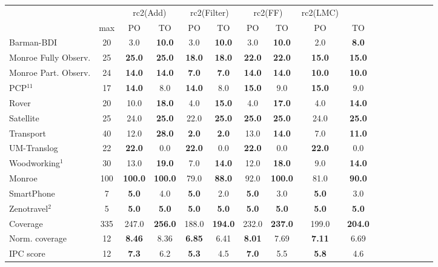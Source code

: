 \begin{tabular}{lccccccccccccccccl} 
\toprule 
  && \multicolumn{2}{c}{rc2(Add)} & \multicolumn{2}{c}{rc2(Filter)} & \multicolumn{2}{c}{rc2(FF)} & \multicolumn{2}{c}{rc2(LMC)} \\ 
\cmidrule(lr){3-4} \cmidrule(lr){5-6} \cmidrule(lr){7-8} \cmidrule(lr){9-10}  
 & max &PO & TO & PO & TO & PO & TO & PO &\multicolumn{2}{c}{ TO  } \\ 
\midrule 
Barman-BDI & 20 & 3.0 & \textbf{10.0} & 3.0 & \textbf{10.0} & 3.0 & \textbf{10.0} & 2.0 &\multicolumn{2}{c}{ \textbf{8.0}  } \\ 
Monroe Fully Observ. & 25 & \textbf{25.0} & \textbf{25.0} & \textbf{18.0} & \textbf{18.0} & \textbf{22.0} & \textbf{22.0} & \textbf{15.0} &\multicolumn{2}{c}{ \textbf{15.0}  } \\ 
Monroe Part. Observ. & 24 & \textbf{14.0} & \textbf{14.0} & \textbf{7.0} & \textbf{7.0} & \textbf{14.0} & \textbf{14.0} & \textbf{10.0} &\multicolumn{2}{c}{ \textbf{10.0}  } \\ 
PCP$^{11}$ & 17 & \textbf{14.0} & 8.0 & \textbf{14.0} & 8.0 & \textbf{15.0} & 9.0 & \textbf{15.0} &\multicolumn{2}{c}{ 9.0  } \\ 
Rover & 20 & 10.0 & \textbf{18.0} & 4.0 & \textbf{15.0} & 4.0 & \textbf{17.0} & 4.0 &\multicolumn{2}{c}{ \textbf{14.0}  } \\ 
Satellite & 25 & 24.0 & \textbf{25.0} & 22.0 & \textbf{25.0} & \textbf{25.0} & \textbf{25.0} & 24.0 &\multicolumn{2}{c}{ \textbf{25.0}  } \\ 
Transport & 40 & 12.0 & \textbf{28.0} & \textbf{2.0} & \textbf{2.0} & 13.0 & \textbf{14.0} & 7.0 &\multicolumn{2}{c}{ \textbf{11.0}  } \\ 
UM-Translog & 22 & \textbf{22.0} & 0.0 & \textbf{22.0} & 0.0 & \textbf{22.0} & 0.0 & \textbf{22.0} &\multicolumn{2}{c}{ 0.0  } \\ 
Woodworking$^{1}$ & 30 & 13.0 & \textbf{19.0} & 7.0 & \textbf{14.0} & 12.0 & \textbf{18.0} & 9.0 &\multicolumn{2}{c}{ \textbf{14.0}  } \\ 
\midrule 
 Monroe & 100 & \textbf{100.0} & \textbf{100.0} & 79.0 & \textbf{88.0} & 92.0 & \textbf{100.0} & 81.0 &\multicolumn{2}{c}{ \textbf{90.0}  } \\ 
SmartPhone & 7 & \textbf{5.0} & 4.0 & \textbf{5.0} & 2.0 & \textbf{5.0} & 3.0 & \textbf{5.0} &\multicolumn{2}{c}{ 3.0  } \\ 
Zenotravel$^{2}$ & 5 & \textbf{5.0} & \textbf{5.0} & \textbf{5.0} & \textbf{5.0} & \textbf{5.0} & \textbf{5.0} & \textbf{5.0} &\multicolumn{2}{c}{ \textbf{5.0}  } \\ 
\midrule 
 Coverage & 335 & 247.0 & \textbf{256.0} & 188.0 & \textbf{194.0} & 232.0 & \textbf{237.0} & 199.0 &\multicolumn{2}{c}{ \textbf{204.0}  } \\ 
Norm. coverage & 12 & \textbf{8.46} & 8.36 & \textbf{6.85} & 6.41 & \textbf{8.01} & 7.69 & \textbf{7.11} &\multicolumn{2}{c}{ 6.69  } \\ 
IPC score & 12 & \textbf{7.3} & 6.2 & \textbf{5.3} & 4.5 & \textbf{7.0} & 5.5 & \textbf{5.8} &\multicolumn{2}{c}{ 4.6  } \\ 
\bottomrule 
 \end{tabular} 
